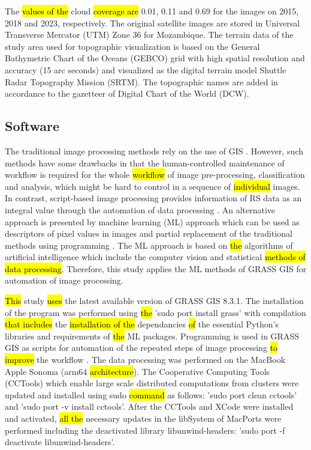 \documentclass[coasts,article,submit,pdftex,moreauthors]{Definitions/mdpi}
\begin{document}
The \hl{values of the }cloud \hl{coverage are} 0.01, 0.11 and 0.69 for the images on 2015, 2018 and 2023, respectively. The original satellite images are stored in Universal Transverse Mercator (UTM) Zone 36 for Mozambique. The terrain data of the study area used for topographic visualization is based on the General Bathymetric Chart of the Oceans (GEBCO) grid with high spatial resolution and accuracy (15 arc seconds) and visualized as the digital terrain model Shuttle Radar Topography Mission (SRTM). The topographic names are added in accordance to the gazetteer of Digital Chart of the World (DCW).  

\subsection{Software}

The traditional image processing methods rely on the use of GIS \cite{GEMUSSE2023101022,LIANG2023113367,BEY2020111611}. However, such methods have some drawbacks in that\hl{ }the human-controlled maintenance of workflow is required for the whole \hl{workflow} of image pre-processing, classification and analysis, which might be hard to control in a sequence of \hl{individual }images. In contrast, script-based image processing provides information of RS data as an integral value through the automation of data processing \cite{Lemenkova202213}. An alternative approach is presented by machine learning (ML) approach which can be used as descriptors of pixel values in images and partial replacement of the traditional methods using programming \cite{jimaging9050098,Lemenkova202229}. The ML approach is based on \hl{the} algorithms of artificial intelligence which include the computer vision and statistical \hl{methods of data processing}. Therefore, this study applies the ML methods of GRASS GIS for automation of image processing.

\hl{This} study \hl{uses} the latest available version of GRASS GIS 8.3.1. The installation of the program was performed using \hl{the }'sudo port install grass' with compilation \hl{that includes }the \hl{installation of the }dependancies \hl{of} the essential Python's libraries and requirements of \hl{the }ML packages. Programming is used in GRASS GIS as scripts for automation of the repeated steps of image processing \hl{to improve} the workflow \cite{technologies11020046,jmse11040871}. The data processing was performed on the MacBook Apple Sonoma (arm64 \hl{architecture}). The Cooperative Computing Tools (CCTools) which enable large scale distributed computations from clusters were updated and installed using sudo \hl{command} as follows: 'sudo port clean cctools' and 'sudo port -v install cctools'. After the CCTools and XCode were installed and activated, \hl{all the }necessary updates in the libSystem of MacPorts were performed including the deactivated library libunwind-headers: 'sudo port -f deactivate libunwind-headers'. 
\end{document}
